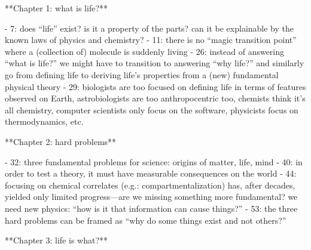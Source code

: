 \documentclass[11pt]{article}
\begin{document}
\begin{markdown}

**Chapter 1: what is life?**

- 7: does “life” exist? is it a property of the parts? can it be explainable by the known laws of physics and chemistry?
- 11: there is no “magic transition point” where a (collection of) molecule is suddenly living
- 26: instead of answering “what is life?” we might have to transition to answering “why life?” and similarly go from defining life to deriving life’s properties from a (new) fundamental physical theory
- 29: biologists are too focused on defining life in terms of features observed on Earth, astrobiologists are too anthropocentric too, chemists think it’s all chemistry, computer scientists only focus on the software, physicists focus on thermodynamics, etc.

**Chapter 2: hard problems**

- 32: three fundamental problems for science: origins of matter, life, mind
- 40: in order to test a theory, it must have measurable consequences on the world
- 44: focusing on chemical correlates (e.g.: compartmentalization) has, after decades, yielded only limited progress—are we missing something more fundamental? we need new physics: “how is it that information can cause things?”
- 53: the three hard problems can be framed as “why do some things exist and not others?”

**Chapter 3: life is what?**


\end{markdown}
\end{document}
